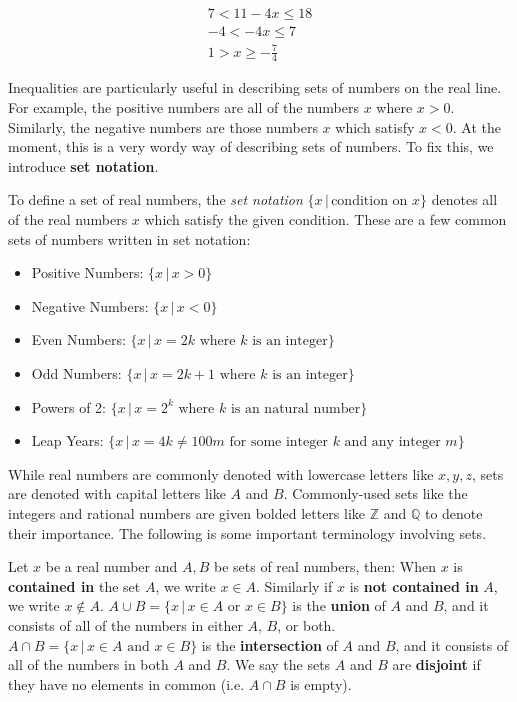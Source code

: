 \documentclass{article}
\newcommand{\tb}[1]{\textbf{#1}}
\newenvironment{mybox}[3]{
    \begin{center}
    \begin{tcolorbox}[width=#2\textwidth, colback={#3}, colbacktitle={#3}, title={\tb{#1}}, coltitle={black}, colframe={#3}, arc=1pt, breakable]}
    {\end{tcolorbox} 
    \end{center}}
\begin{document}
\begin{gather*}
    7 < 11 - 4x \leq 18 \\
    -4 < -4x \leq 7  \\
    1 > x \geq -\frac{7}{4} 
\end{gather*}

\vspace{5pt}
Inequalities are particularly useful in describing sets of numbers on the real line. For example, the positive numbers are all of the numbers $x$ where $x>0$. Similarly, the negative numbers are those numbers $x$ which satisfy $x<0$. At the moment, this is a very wordy way of describing sets of numbers. To fix this, we introduce \tb{set notation}.

\begin{mybox}{Set Notation}{0.9}{babyblue}
    To define a set of real numbers, the \emph{set notation} $\{x \,|\, \textrm{condition on }x \}$ denotes all of the real numbers $x$ which satisfy the given condition. These are a few common sets of numbers written in set notation:

    \vspace{5pt}
    \begin{itemize}
        \setlength\itemsep{0em}
        \item Positive Numbers: $\{x \,|\, x>0\}$
        \item Negative Numbers: $\{x \,|\, x<0\}$
        \item Even Numbers: $\{x \,|\, x=2k \textrm{ where } k \textrm{ is an integer}\}$
        \item Odd Numbers: $\{x \,|\, x=2k + 1 \textrm{ where } k \textrm{ is an integer}\}$
        \item Powers of 2: $\{x \,|\, x=2^k \textrm{ where } k \textrm{ is an natural number}\}$
        \item Leap Years: $\{x \,|\, x=4k \neq 100m \textrm{ for some integer } k \textrm{ and any integer } m \}$
    \end{itemize}
\end{mybox}

While real numbers are commonly denoted with lowercase letters like $x,y,z$, sets are denoted with capital letters like $A$ and $B$. Commonly-used sets like the integers and rational numbers are given bolded letters like $\mathbb{Z}$ and $\mathbb{Q}$ to denote their importance. The following is some important terminology involving sets.

\vspace{5pt}
\begin{outline}
    \0 Let $x$ be a real number and $A, B$ be sets of real numbers, then:
    \1 When $x$ is \tb{contained in} the set $A$, we write $x \in A$. Similarly if $x$ is \tb{not contained in} $A$, we write $x \not\in A$. 
    \1 $A \cup B = \{x \,|\,x\in A \textrm{ or } x \in B\}$ is the \tb{union} of $A$ and $B$, and it consists of all of the numbers in either $A$, $B$, or both.
    \1 $A \cap B = \{x \,|\,x\in A \textrm{ and } x \in B\}$ is the \tb{intersection} of $A$ and $B$, and it consists of all of the numbers in both $A$ and $B$.
    \1 We say the sets $A$ and $B$ are \tb{disjoint} if they have no elements in common (i.e. $A \cap B$ is empty).
\end{outline}
\end{document}
